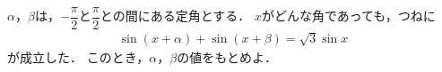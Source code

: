 \documentclass[../../main.tex]{subfiles}
\begin{document}
$\alpha$，$\beta$は，$\displaystyle -\dfrac{\pi}{2}$と$\displaystyle \dfrac{\pi}{2}$との間にある定角とする．
$x$がどんな角であっても，つねに
\begin{align*}
  \sin(x+\alpha)+\sin(x+\beta)=\sqrt3\sin x
\end{align*}
が成立した．
このとき，$\alpha$，$\beta$の値をもとめよ．
\end{document}
